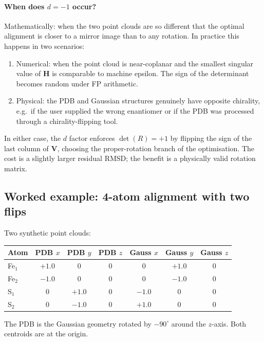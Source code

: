 \documentclass[10pt,a4paper,twoside]{article}
\newcommand{\Hmat}{\mathbf{H}}
\newcommand{\Vmat}{\mathbf{V}}
\begin{document}
\paragraph{When does $d = -1$ occur?}
Mathematically: when the two point clouds are so different that
the optimal alignment is closer to a mirror image than to any
rotation. In practice this happens in two scenarios:

\begin{enumerate}
  \item Numerical: when the point cloud is near-coplanar and the
        smallest singular value of $\Hmat$ is comparable to
        machine epsilon. The sign of the determinant becomes
        random under FP arithmetic.
  \item Physical: the PDB and Gaussian structures genuinely have
        opposite chirality, e.g.\ if the user supplied the wrong
        enantiomer or if the PDB was processed through a
        chirality-flipping tool.
\end{enumerate}

In either case, the $d$ factor enforces $\det(R) = +1$ by
flipping the sign of the last column of $\Vmat$, choosing the
proper-rotation branch of the optimisation. The cost is a
slightly larger residual RMSD; the benefit is a physically valid
rotation matrix.

\subsection{Worked example: 4-atom alignment with two flips}

Two synthetic point clouds:

\begin{center}
\begin{tabular}{lccc|ccc}
\toprule
Atom & PDB $x$ & PDB $y$ & PDB $z$ & Gauss $x$ & Gauss $y$ & Gauss $z$ \\
\midrule
Fe$_1$ & $+1.0$ & $0$    & $0$    & $0$     & $+1.0$ & $0$    \\
Fe$_2$ & $-1.0$ & $0$    & $0$    & $0$     & $-1.0$ & $0$    \\
S$_1$  & $0$    & $+1.0$ & $0$    & $-1.0$  & $0$    & $0$    \\
S$_2$  & $0$    & $-1.0$ & $0$    & $+1.0$  & $0$    & $0$    \\
\bottomrule
\end{tabular}
\end{center}

The PDB is the Gaussian geometry rotated by $-90^\circ$ around the
$z$-axis. Both centroids are at the origin.
\end{document}

